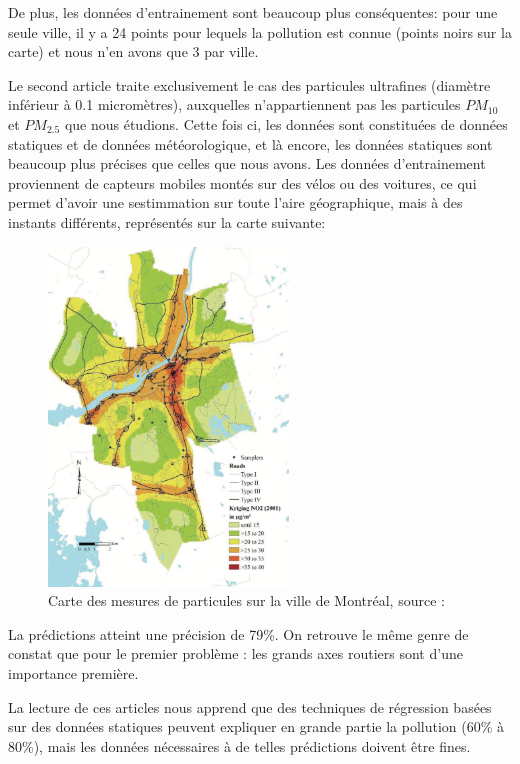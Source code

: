 De plus, les données d'entrainement sont beaucoup plus conséquentes: pour une seule ville, il y a 24 points pour lequels la pollution est connue (points noirs sur la carte) et nous n'en avons que 3 par ville.


Le second article \cite{PMreg} traite exclusivement le cas des particules ultrafines (diamètre inférieur à 0.1 micromètres), auxquelles n'appartiennent pas les particules $PM_{10}$ et $PM_{2.5}$ que nous étudions.
Cette fois ci, les données sont constituées de données statiques et de données météorologique, et là encore, les données statiques sont beaucoup plus précises que celles que nous avons.
Les données d'entrainement proviennent de capteurs mobiles montés sur des vélos ou des voitures, ce qui permet d'avoir une sestimmation sur toute l'aire géographique, mais à des instants différents, représentés sur la carte suivante:

\begin{figure}
  \includegraphics[height=9cm]{images/pollution_gothenburg.png}
  \caption{Carte des mesures de particules sur la ville de Montréal, source : \cite{PMreg}}
\end{figure}

La prédictions atteint une précision de 79\%.
On retrouve le même genre de constat que pour le premier problème : les grands axes routiers sont d'une importance première.

La lecture de ces articles nous apprend que des techniques de régression basées sur des données statiques peuvent expliquer en grande partie la pollution (60\% à 80\%), mais les données nécessaires à de telles prédictions doivent être fines.
